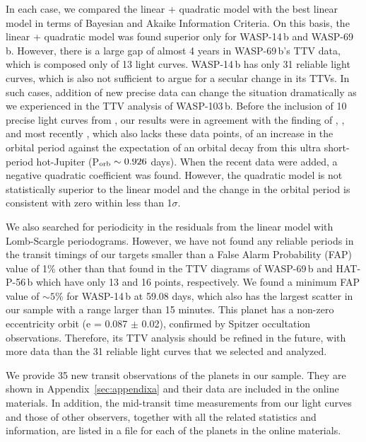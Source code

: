 \documentclass[a4paper,fleqn,usenatbib]{mnras}
\begin{document}
In each case, we compared the linear + quadratic model with the best linear model in terms of Bayesian and Akaike Information Criteria. On this basis, the linear + quadratic model was found superior only for WASP-14\,b and WASP-69\,b. However, there is a large gap of almost 4 years in WASP-69\,b's TTV data, which is composed only of 13 light curves. WASP-14\,b has only 31 reliable light curves, which is also not sufficient to argue for a secular change in its TTVs. In such cases, addition of new precise data can change the situation dramatically as we experienced in the TTV analysis of WASP-103\,b. Before the inclusion of 10 precise light curves from \cite{2021AJ....162...34K}, our results were in agreement with the finding of \cite{2018AcA....68..371M}, \citet{2020AJ....159..150P}, and most recently \cite{2022A&A...658C...1B}, which also lacks these data points, of an increase in the orbital period against the expectation of an orbital decay from this ultra short-period hot-Jupiter (P$_{\rm orb} \sim 0.926$ days). When the recent data were added, a negative quadratic coefficient was found. However, the quadratic model is not statistically superior to the linear model and the change in the orbital period is consistent with zero within less than 1$\sigma$.

We also searched for periodicity in the residuals from the linear model with Lomb-Scargle periodograms. However, we have not found any reliable periods in the transit timings of our targets smaller than a False Alarm Probability (FAP) value of 1\% other than that found in the TTV diagrams of WASP-69\,b and HAT-P-56\,b which have only 13 and 16 points, respectively. We found a minimum FAP value of $\sim5$\% for WASP-14\,b at 59.08 days, which also has the largest scatter in our sample with a range larger than 15 minutes. This planet has a non-zero eccentricity orbit (e = 0.087 $\pm$ 0.02), confirmed by Spitzer occultation observations. Therefore, its TTV analysis should be refined in the future, with more data than the 31 reliable light curves that we selected and analyzed.

We provide 35 new transit observations of the planets in our sample. They are shown in Appendix~\ref{sec:appendixa} and their data are included in the online materials. In addition, the mid-transit time measurements from our light curves and those of other observers, together with all the related statistics and information, are listed in a file for each of the planets in the online materials. 
\end{document}
